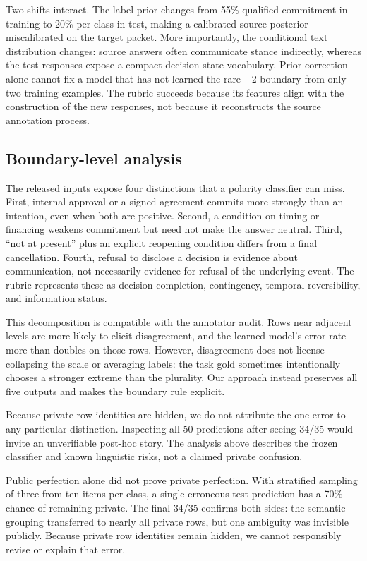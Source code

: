 \documentclass[11pt]{article}
\begin{document}
Two shifts interact.  The label prior changes from 55\% qualified commitment
in training to 20\% per class in test, making a calibrated source posterior
miscalibrated on the target packet.  More importantly, the conditional text
distribution changes: source answers often communicate stance indirectly,
whereas the test responses expose a compact decision-state vocabulary.  Prior
correction alone cannot fix a model that has not learned the rare $-2$ boundary
from only two training examples.  The rubric succeeds because its features
align with the construction of the new responses, not because it reconstructs
the source annotation process.

\subsection{Boundary-level analysis}
The released inputs expose four distinctions that a polarity classifier can
miss.  First, internal approval or a signed agreement commits more strongly
than an intention, even when both are positive.  Second, a condition on timing
or financing weakens commitment but need not make the answer neutral.  Third,
``not at present'' plus an explicit reopening condition differs from a final
cancellation.  Fourth, refusal to disclose a decision is evidence about
communication, not necessarily evidence for refusal of the underlying event.
The rubric represents these as decision completion, contingency, temporal
reversibility, and information status.

This decomposition is compatible with the annotator audit.  Rows near adjacent
levels are more likely to elicit disagreement, and the learned model's error
rate more than doubles on those rows.  However, disagreement does not license
collapsing the scale or averaging labels: the task gold sometimes intentionally
chooses a stronger extreme than the plurality.  Our approach instead preserves
all five outputs and makes the boundary rule explicit.

Because private row identities are hidden, we do not attribute the one error to
any particular distinction.  Inspecting all 50 predictions after seeing 34/35
would invite an unverifiable post-hoc story.  The analysis above describes the
frozen classifier and known linguistic risks, not a claimed private confusion.

Public perfection alone did not prove private perfection. With stratified sampling of three from ten items per class, a single erroneous test prediction has a 70\% chance of remaining private. The final 34/35 confirms both sides: the semantic grouping transferred to nearly all private rows, but one ambiguity was invisible publicly. Because private row identities remain hidden, we cannot responsibly revise or explain that error.
\end{document}
